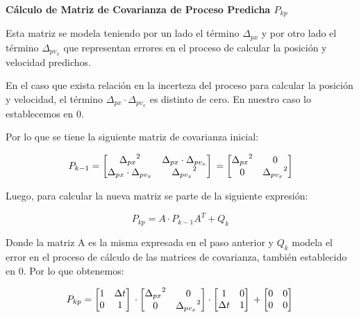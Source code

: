 \textbf{Cálculo de Matriz de Covarianza de Proceso Predicha $P_{kp}$} \mbox{} \vspace{8pt}

Esta matriz se modela teniendo por un lado el término $\Delta_{px}$ y por otro lado el término $\Delta_{pv_x}$ que representan errores en el proceso de calcular la posición y velocidad predichos.

En el caso que exista relación en la incerteza del proceso para calcular la posición y velocidad, el término $\Delta_{px} \cdot \Delta_{pv_x}$ es distinto de cero. En nuestro caso lo establecemos en $0$.

Por lo que se tiene la siguiente matriz de covarianza inicial:

$$
P_{k-1} = \begin{bmatrix}
    {\Delta_{px}}^2 & \Delta_{px} \cdot \Delta_{pv_x} \\
    \Delta_{px} \cdot \Delta_{pv_x} & {\Delta_{pv_x}}^2 \\
    \end{bmatrix} \\
    = \begin{bmatrix}
    {\Delta_{px}}^2 & 0 \\
    0 & {\Delta_{pv_x}}^2 \\
    \end{bmatrix} 
$$

Luego, para calcular la nueva matriz se parte de la siguiente expresión:

$$ P_{kp} = A \cdot P_{k-1} A^T + Q_k $$

Donde la matriz A es la misma expresada en el paso anterior y $Q_k$ modela el error en el proceso de cálculo de las matrices de covarianza, también establecido en $0$. Por lo que obtenemos:

$$ P_{kp} =
    \begin{bmatrix}
    1 & \Delta t  \\
    0 & 1         \\
    \end{bmatrix} \\
    \cdot 
    \begin{bmatrix}
    {\Delta_{px}}^2 & 0   \\
    0 & {\Delta_{pv_x}}^2 \\
    \end{bmatrix}
    \cdot
    \begin{bmatrix}
    1 & 0           \\
    \Delta t & 1    \\
    \end{bmatrix}   \\
    +
    \begin{bmatrix}
    0 & 0  \\
    0 & 0  \\
    \end{bmatrix}  \\
$$

